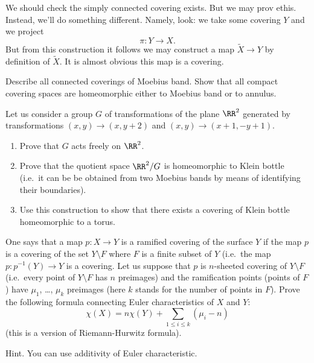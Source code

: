 We should check the simply connected covering exists. But we may
prov ethis. Instead, we'll do something different. Namely, look:
we take some covering $Y$ and we project
\begin{equation}
\pi\colon Y\to X.
\end{equation}
But from this construction it follows we may construct a map
$\widetilde{X}\to Y$ by definition of $\widetilde{X}$. It is
almost obvious this map is a covering.

\exercises
\begin{xca}
Describe all connected coverings of Moebius band. Show that all
compact covering spaces are homeomorphic either to Moebius band
or to annulus.
\end{xca}
\begin{xca}
Let us consider a group $G$ of transformations of the plane
$\RR^2$ generated by transformations $(x, y)\to(x, y + 2)$ and
$(x, y)\to(x + 1, -y + 1)$. 
\begin{enumerate}
\item Prove that $G$ acts freely on $\RR^2$.
\item Prove that the quotient space $\RR^2/G$ is homeomorphic to
Klein bottle (i.e.\ it can be be obtained from two Moebius bands
by means of identifying their boundaries).
\item Use this construction to show that there exists a covering
of Klein bottle homeomorphic to a torus.
\end{enumerate}
\end{xca}
\begin{xca}
One says that a map $p\colon X\to Y$ is a ramified covering of the surface $Y$ if the map $p$ is a covering of the set $Y\setminus F$ where $F$ is a finite subset of $Y$ (i.e.\ the map $p\colon p^{-1}(Y)\to Y$ is a covering. Let us suppose that $p$ is $n$-sheeted covering of $Y\setminus F$ (i.e.\ every point of $Y\setminus F$ has $n$ preimages) and the ramification points (points of $F$) have $\mu_{1}$, \dots, $\mu_{k}$ preimages (here $k$ stands for the number of points in $F$). Prove the following formula connecting Euler characteristics of $X$ and $Y$:
\begin{equation}
\chi(X)=n\chi(Y)+\sum_{1\leq i\leq k}(\mu_{i}-n)
\end{equation}
(this is a version of Riemann-Hurwitz formula).

Hint. You can use additivity of Euler characteristic.
\end{xca}
